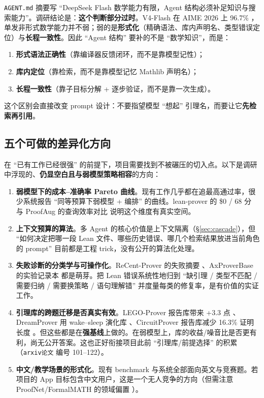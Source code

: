 \documentclass[UTF8,a4paper,11pt,fontset=windows]{ctexart}
\newcommand{\code}[1]{\texttt{#1}}
\begin{document}
\code{AGENT.md} 摘要写 ``DeepSeek Flash 数学能力有限，Agent 结构必须补足知识与搜索能力''。调研结论是：\textbf{这个判断部分过时}。V4-Flash 在 AIME 2026 上 96.7\% \cite{layerlens}，单发非形式数学能力并不弱；弱的是\textbf{形式化}（精确语法、库内声明名、类型错误定位）与\textbf{长程一致性}。因此 ``Agent 结构'' 要补的不是 ``数学知识''，而是：

\begin{enumerate}
  \item \textbf{形式语法正确性}（靠编译器反馈闭环，而不是靠模型记性）；
  \item \textbf{库内定位}（靠检索，而不是靠模型记忆 Mathlib 声明名）；
  \item \textbf{长程一致性}（靠子目标分解 + 逐步验证，而不是靠一次生成）。
\end{enumerate}

这个区别会直接改变 prompt 设计：不要指望模型 ``想起'' 引理名，而要让它\textbf{先检索再引用}。

\subsection{五个可做的差异化方向}

在 ``已有工作已经很强'' 的前提下，项目需要找到不被碾压的切入点。以下是调研中浮现的、\textbf{仍显空白且与弱模型策略相容}的方向：

\begin{enumerate}
  \item \textbf{弱模型下的成本--准确率 Pareto 曲线}。现有工作几乎都在追最高通过率，很少系统报告 ``同等预算下弱模型 + 编排'' 的曲线。lean-prover 的 \$0 / 68 分 \cite{leanproverrepo} 与 ProofAug 的查询效率对比 \cite{proofaug} 说明这个维度有真实空间。
  \item \textbf{上下文预算的算法}。多 Agent 的核心价值是上下文隔离（\S\ref{sec:cascade}），但 ``如何决定把哪一段 Lean 文件、哪些历史错误、哪几个检索结果放进当前角色的 prompt'' 目前都是工程 trick，没有公开的算法化处理。
  \item \textbf{失败诊断的分类学与可操作化}。ReCent-Prover 的失败摘要 \cite{recent}、AxProverBase 的实验记录本 \cite{axprover} 都是萌芽。把 Lean 错误系统性地归到 ``缺引理 / 类型不匹配 / 需要归纳 / 需要换策略 / 语句理解错'' 并度量每类的修复率，是有价值的实证工作。
  \item \textbf{引理库的跨题迁移是否真实有效}。LEGO-Prover 报告库带来 +3.3 点 \cite{lego}、DreamProver 用 wake--sleep 演化库 \cite{dreamprover}、CircuitProver 报告库减少 16.3\% 证明长度 \cite{circuitprover}。但这些都是在\textbf{强基线}上做的。在弱模型上，库的收益/噪音比是否更有利，尚无公开答案。这也正好衔接项目此前 ``引理库/前提选择'' 的积累（\code{arxiv论文} 编号 101--122）。
  \item \textbf{中文/教学场景的形式化}。现有 benchmark 与系统全部面向英文与竞赛题。若项目的 App 目标包含中文用户，这是一个无人竞争的方向（但需注意 ProofNet/\allowbreak FormalMATH 的领域偏置 \cite{proofnet,formalmmath}）。
\end{enumerate}
\end{document}
